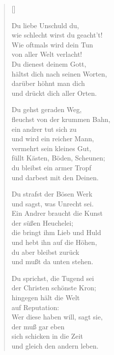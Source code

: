 \begin{multicols}{2}
\settowidth{\versewidth}{Du strafst der Bösen Werk}
\begin{verse}[\versewidth]

   Du liebe Unschuld du,\\
  wie schlecht wirst du geacht't!\\
  Wie oftmals wird dein Tun\\
  von aller Welt verlacht!\\
  Du dienest deinem Gott,\\
  hältst dich nach seinen Worten,\\
  darüber höhnt man dich\\
  und drückt dich aller Orten.

   Du gehst geraden Weg,\\
  fleuchst von der krummen Bahn,\\
  ein andrer tut sich zu\\
  und wird ein reicher Mann,\\
  vermehrt sein kleines Gut,\\
  füllt Kästen, Böden, Scheunen;\\
  du bleibst ein armer Tropf\\
  und darbest mit den Deinen.

   Du strafst der Bösen Werk\\
  und sagst, was Unrecht sei.\\
  Ein Andrer braucht die Kunst\\
  der süßen Heuchelei;\\
  die bringt ihm Lieb und Huld\\
  und hebt ihn auf die Höhen,\\
  du aber bleibst zurück\\
  und mußt da unten stehen.

   Du sprichst, die Tugend sei\\
  der Christen schönste Kron;\\
  hingegen hält die Welt\\
  auf Reputation:\\
  Wer diese haben will, sagt sie,\\
  der muß gar eben\\
  sich schicken in die Zeit\\
  und gleich den andern leben.


\end{verse}
\end{multicols}
